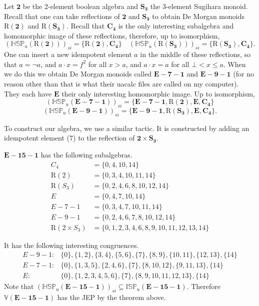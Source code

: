 \documentclass[11pt]{amsart}
\begin{document}
Let $\mathbf{2}$ be the 2-element boolean algebra and $\mathbf{S_3}$ the 3-element Sugihara monoid. Recall that one can take reflections of $\mathbf{2}$ and $\mathbf{S_3}$ to obtain De Morgan monoids $\text{R}(\mathbf{2})$ and $\text{R}(\mathbf{S_3})$. Recall that $\mathbf{C_4}$ is the only interesting subalgebra and homomorphic image of these reflections, therefore, up to isomorphism,
$$ (\mathbb{HSP}_u(\text{R}(\mathbf{2})))_{si} = \{\text{R}(\mathbf{2}),\mathbf{C_4}\} \quad (\mathbb{HSP}_u(\text{R}(\mathbf{S_3})))_{si} = \{\text{R}(\mathbf{S_3}),\mathbf{C_4}\}. $$
One can insert a new idempotent element $a$ in the middle of these reflections, so that $a = \neg a$, and $a \cdot x = f^2$ for all $x > a$, and $a \cdot x = a$ for all $\bot < x \leq a$. When we do this we obtain De Morgan monoids called $\mathbf{E-7-1}$ and $\mathbf{E-9-1}$ (for no reason other than that is what their uacalc files are called on my computer). They each have $\mathbf{E}$ their only interesting homomorphic image. Up to isomorphism,
$$ (\mathbb{HSP}_u(\mathbf{E-7-1}))_{si} = \{\mathbf{E-7-1},\text{R}(\mathbf{2}),\mathbf{E},\mathbf{C_4}\}$$
\begin{equation}
\label{eq:9si}
(\mathbb{HSP}_u(\mathbf{E-9-1}))_{si} = \{\mathbf{E-9-1},\text{R}(\mathbf{S_3}),\mathbf{E},\mathbf{C_4}\}.
\end{equation}



To construct our algebra, we use a similar tactic. It is constructed by adding an idempotent element (7) to the reflection of $\mathbf{2} \times \mathbf{S_3}$.



$\mathbf{E-15-1}$ has the following subalgebras.
\begin{align*}
C_4 &= \{0,4,10,14\} \\
\text{R}(2) &= \{0,3,4,10,11,14\} \\
\text{R}(S_3) &= \{0,2,4,6,8,10,12,14\} \\
E &= \{0,4,7,10,14\} \\
E-7-1 &= \{0,3,4,7,10,11,14\} \\
E-9-1 &= \{0,2,4,6,7,8,10,12,14\} \\
\text{R}(2 \times S_3) &= \{0,1,2,3,4,6,8,9,10,11,12,13,14\}
\end{align*}

It has the following interesting congruences.
\begin{align*}
E-9-1:&\{0\},\{1,2\},\{3,4\},\{5,6\},\{7\},\{8,9\},\{10,11\},\{12,13\},\{14\} \\
E-7-1:&\{0\},\{1,3,5\},\{2,4,6\},\{7\},\{8,10,12\},\{9,11,13\},\{14\} \\
E:&\{0\},\{1,2,3,4,5,6\},\{7\},\{8,9,10,11,12,13\},\{14\}
\end{align*}
Note that $(\mathbb{HSP}_u(\mathbf{E-15-1}))_{si} \subseteq \mathbb{ISP}_u(\mathbf{E-15-1})$. Therefore $\mathbb{V}(\mathbf{E-15-1})$ has the JEP by the theorem above.
\end{document}
